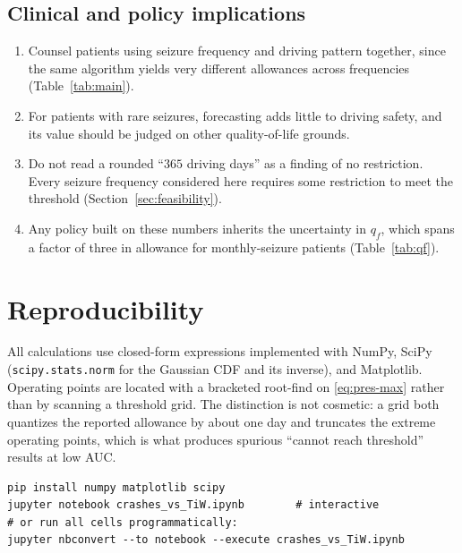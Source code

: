 \documentclass[11pt]{article}
\numberwithin{equation}{section}
\begin{document}
\subsection{Clinical and policy implications}
\label{sec:rec-clin}
\begin{enumerate}[leftmargin=2em,itemsep=2pt]
  \item Counsel patients using seizure frequency and driving pattern together, since
  the same algorithm yields very different allowances across frequencies
  (Table~\ref{tab:main}).
  \item For patients with rare seizures, forecasting adds little to driving safety, and
  its value should be judged on other quality-of-life grounds.
  \item Do not read a rounded ``$365$ driving days'' as a finding of no restriction.
  Every seizure frequency considered here requires some restriction to meet the
  threshold (Section~\ref{sec:feasibility}).
  \item Any policy built on these numbers inherits the uncertainty in $q_f$, which spans
  a factor of three in allowance for monthly-seizure patients
  (Table~\ref{tab:qf}).
\end{enumerate}

\section{Reproducibility}
\label{sec:reproducibility}

All calculations use closed-form expressions implemented with NumPy, SciPy
(\texttt{scipy.stats.norm} for the Gaussian CDF and its inverse), and Matplotlib.
Operating points are located with a bracketed root-find on \eqref{eq:pres-max} rather
than by scanning a threshold grid. The distinction is not cosmetic: a grid both
quantizes the reported allowance by about one day and truncates the extreme operating
points, which is what produces spurious ``cannot reach threshold'' results at low AUC.

\begin{verbatim}
pip install numpy matplotlib scipy
jupyter notebook crashes_vs_TiW.ipynb        # interactive
# or run all cells programmatically:
jupyter nbconvert --to notebook --execute crashes_vs_TiW.ipynb
\end{verbatim}
\end{document}
